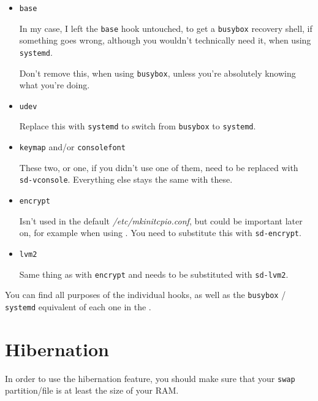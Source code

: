 \documentclass[10pt]{dustdoc}
\begin{document}
\begin{itemize}
    \item \texttt{base}

        In my case, I left the \texttt{base} hook untouched, to get a \texttt{busybox} recovery shell, if something goes wrong, although you wouldn’t technically need it, when using \texttt{systemd}.

        \begin{WARNING}
            Don’t remove this, when using \texttt{busybox}, unless you’re absolutely knowing what you’re doing.
        \end{WARNING}

    \item \texttt{udev}

        Replace this with \texttt{systemd} to switch from \texttt{busybox} to \texttt{systemd}.

    \item \texttt{keymap} and/or \texttt{consolefont}

        These two, or one, if you didn’t use one of them, need to be replaced with \texttt{sd-vconsole}.
        Everything else stays the same with these.

    \item \texttt{encrypt}

        Isn’t used in the default \textit{/etc/mkinitcpio.conf}, but could be important later on, for example when using .
        You need to substitute this with \texttt{sd-encrypt}.

    \item \texttt{lvm2}

        Same thing as with \texttt{encrypt} and needs to be substituted with \texttt{sd-lvm2}.
\end{itemize}

\begin{NOTE}
    You can find all purposes of the individual hooks, as well as the \texttt{busybox} / \texttt{systemd} equivalent of each one in the .
\end{NOTE}

\section{Hibernation}
\label{sec:hibernation}

In order to use the hibernation feature, you should make sure that your \texttt{swap} partition/file is at least the size of your RAM.
\end{document}
